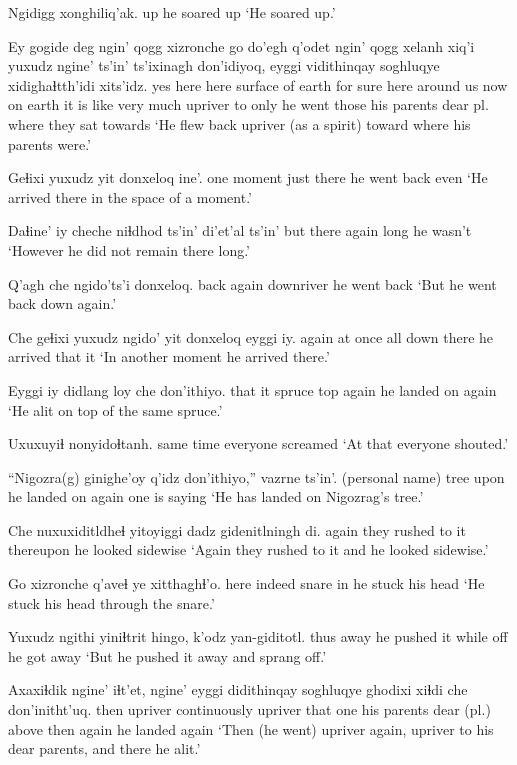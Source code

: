 \documentclass[12pt]{article}
\begin{document}
\gll Ngidigg xonghiliq'ak.
up  {he soared up}
\glt `He soared up.'
\glend

\gll Ey gogide deg {ngin' qogg}  xizronche go do'egh q'odet {ngin' qogg} xelanh xiq'i yuxudz {ngine' ts'in'} ts'ixinagh don'idiyoq, eyggi  vidithinqay soghluqye {xidighaɬtth'idi} xits'idz. 
yes here here {surface of earth} {for sure} here {around us} now {on earth} {it is} like {very much} upriver  {to only} {he went} those  {his parents}  {dear pl.}  {where they sat} towards
\glt `He flew back upriver (as a spirit) toward where his parents were.'
\glend

\gll Geɬixi yuxudz yit donxeloq ine'.
{one moment} just there {he went back} even
\glt `He arrived there in the space of a moment.'
\glend

\gll Daɬine' iy cheche niɬdhod ts'in' {di'et'al ts'in'}
but  there again long {} {he wasn't}
\glt `However he did not remain there long.'
\glend

\gll Q'agh che ngido'ts'i donxeloq.
back again downriver  {he went back}
\glt `But he went back down again.'
\glend

\gll Che geɬixi yuxudz ngido' yit donxeloq eyggi  iy.
again {at once} all down there {he arrived} that it
\glt `In another moment he arrived there.'
\glend

\gll Eyggi iy didlang loy che don'ithiyo.
that  it spruce  top again {he landed on again}
\glt `He alit on top of the same spruce.'
\glend

\gll Uxuxuyiɬ nonyidoɬtanh.
{same time} {everyone screamed}
\glt `At that everyone shouted.'
\glend

\gll ``Nigozra(g) ginighe'oy q'idz don'ithiyo,'' vazrne ts'in'.
{(personal name)} tree  upon {he landed on again} {one is saying} 
\glt `He has landed on Nigozrag's tree.'
\glend

\gll Che nuxuxiditldheɬ yitoyiggi {dadz gidenitlningh di.}
again {they rushed to it} thereupon {he looked sidewise}
\glt `Again they rushed to it and he looked sidewise.'
\glend

\gll Go xizronche q'aveɬ ye xitthaghɬ'o.
here indeed  snare in {he stuck his head}
\glt `He stuck his head through the snare.'
\glend

\gll Yuxudz ngithi  yiniɬtrit hingo, k'odz yan-giditotl.
thus  away  {he pushed it} while off {he got away}
\glt `But he pushed it away and sprang off.'
\glend

\gll Axaxiɬdik ngine' iɬt'et, ngine' eyggi didithinqay soghluqye ghodixi xiɬdi che don'initht'uq.
then  upriver  continuously  upriver  {that one} {his parents} {dear (pl.)} above  then again {he landed again} 
\glt `Then (he went) upriver again, upriver to his dear parents, and there he alit.'
\glend
\end{document}
